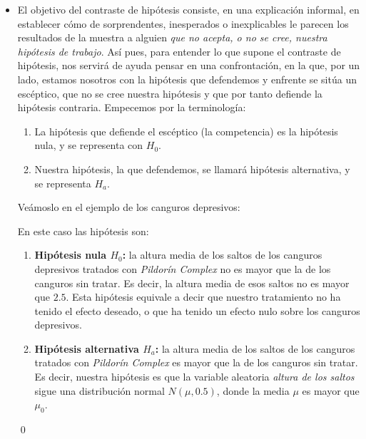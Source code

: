 \begin{itemize}
    \item El objetivo del contraste de hipótesis consiste, en una explicación informal, en establecer cómo de sorprendentes,  inesperados  o inexplicables le parecen los resultados de la muestra a alguien {\em que no acepta, o no se cree, nuestra hipótesis de trabajo}. Así pues, para entender lo que supone el contraste de hipótesis, nos servirá de ayuda pensar en una confrontación, en la que, por un lado, estamos nosotros con la hipótesis que defendemos y enfrente se sitúa un escéptico, que no se cree nuestra hipótesis y que por tanto defiende la hipótesis contraria. Empecemos por la terminología:
        \begin{enumerate}
        \item La hipótesis que defiende el escéptico (la competencia) es la {\sf hipótesis nula}, y se representa con $H_0$.
        \item Nuestra hipótesis, la que defendemos, se llamará {\sf hipótesis alternativa}, y se representa $H_a$.
        \end{enumerate}
        Veámoslo en el ejemplo de los canguros depresivos:
        \begin{ejemplo}
        En este caso las hipótesis son:
        \begin{enumerate}
        \item {\bf Hipótesis nula \boldmath $H_0$:} la altura media de los saltos de los canguros depresivos tratados con {\em Pildorín Complex} no es mayor que la de los canguros sin tratar. Es decir, la altura media de esos saltos no es mayor que $2.5$.  Esta hipótesis equivale a decir que nuestro tratamiento no ha tenido el efecto deseado, o que ha tenido un {\sc efecto nulo} sobre los canguros depresivos.
        \item {\bf Hipótesis alternativa \boldmath $H_a$:} la altura media de los saltos de los canguros tratados con {\em Pildorín Complex} es mayor que la de los canguros sin tratar. Es decir, nuestra hipótesis es que la variable aleatoria {\em altura de los saltos} sigue una distribución normal $N(\mu,0.5)$, donde {\sf la media $\mu$ es mayor que $\mu_0$}.
        \end{enumerate}
        \qed
        \end{ejemplo}




\end{itemize}
